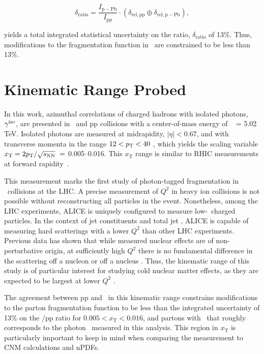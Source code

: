 \begin{equation}
  \delta_\mathrm{ratio} = \frac{I_\mathrm{p-Pb}}{I_\mathrm{pp}}\cdot (\delta_\mathrm{rel,pp} \oplus \delta_\mathrm{rel,p-Pb}),
\end{equation}

yields a total integrated statistical uncertainty on the ratio, $\delta_\mathrm{ratio}$ of 13\%. Thus, modifications to the fragmentation function in \pPb~are constrained to be less than 13\%.


\section{Kinematic Range Probed}

In this work, azimuthal correlations of charged hadrons with isolated photons, $\gamma^\mathrm{iso}$, are presented in \pPb~and pp collisions with a center-of-mass energy of \sqrtsNN~ = 5.02 TeV. Isolated photons are measured at midrapidity, {$|\eta|<0.67$}, and with transverse momenta in the range $12 <p_{\mathrm{T}}<40$ \GeVc, which yields the scaling variable {$x_{\mathrm{T}} = 2\pt/\sqrt{s_{\mathrm{NN}}}\ = $ 0.005--0.016}. This $x_{\mathrm{T}}$ range is similar to RHIC measurements at forward rapidity~\cite{Adare:2011sc}.

This measurement marks the first study of photon-tagged fragmentation in \pPb~collisions at the LHC. A precise measurement of $Q^2$ in heavy ion collisions is not possible without reconstructing all particles in the event. Nonetheless, among the LHC experiments, ALICE is uniquely configured to measure low-\pt~charged particles. In the context of jet constituents and total jet \pt, ALICE is capable of measuring hard scatterings with a lower $Q^{2}$ than other LHC experiments. Previous data has shown that while measured nuclear effects are of non-perturbative origin, at sufficiently high $Q^2$ there is no fundamental difference in the scattering off a nucleon or off a nucleus \cite{epps16:2017,ALTARELLI1977298}. Thus, the kinematic range of this study is of particular interest for studying cold nuclear matter effects, as they are expected to be largest at lower $Q^{2}$ \cite{epps16:2017}. 

The agreement between pp and \pPb~in this kinematic range constrains modifications to the parton fragmentation function to be less than the integrated uncertainty of 13\% on the \pPb/pp ratio for $ 0.005 < x_{\mathrm{T}} < 0.016$, and partons with \pt~that roughly corresponds to the photon \pt~measured in this analysis. This region in $x_\mathrm{T}$ is particularly important to keep in mind when comparing the measurement to CNM calculations and nPDFs.

